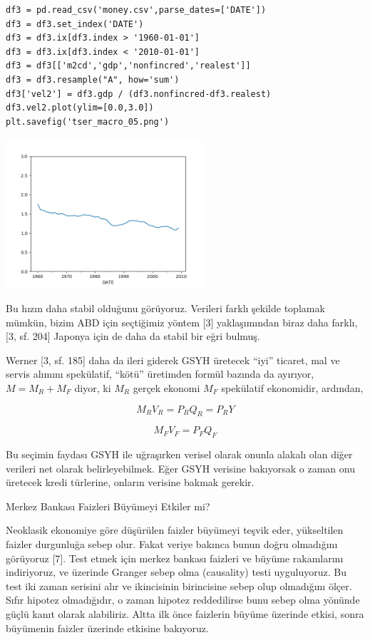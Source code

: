 \documentclass[12pt,fleqn]{article}\usepackage{../../common}
\begin{document}
\begin{verbatim}
df3 = pd.read_csv('money.csv',parse_dates=['DATE'])
df3 = df3.set_index('DATE')
df3 = df3.ix[df3.index > '1960-01-01']
df3 = df3.ix[df3.index < '2010-01-01']
df3 = df3[['m2cd','gdp','nonfincred','realest']]
df3 = df3.resample("A", how='sum') 
df3['vel2'] = df3.gdp / (df3.nonfincred-df3.realest)
df3.vel2.plot(ylim=[0.0,3.0])
plt.savefig('tser_macro_05.png')
\end{verbatim}

\includegraphics[width=20em]{tser_macro_05.png}

Bu hızın daha stabil olduğunu görüyoruz. Verileri farklı şekilde toplamak
mümkün, bizim ABD için seçtiğimiz yöntem [3] yaklaşımından biraz daha
farklı, [3, sf. 204] Japonya için de daha da stabil bir eğri bulmuş. 

Werner [3, sf. 185] daha da ileri giderek GSYH üretecek ``iyi'' ticaret,
mal ve servis alımını spekülatif, ``kötü'' üretimden formül bazında da
ayırıyor, $M = M_R + M_F$ diyor, ki $M_R$ gerçek ekonomi $M_F$ spekülatif
ekonomidir, ardından,

$$ M_RV_R = P_RQ_R = P_RY$$

$$ M_FV_F = P_FQ_F$$

Bu seçimin faydası GSYH ile uğraşırken verisel olarak onunla alakalı olan
diğer verileri net olarak belirleyebilmek. Eğer GSYH verisine bakıyorsak o
zaman onu üretecek kredi türlerine, onların verisine bakmak gerekir.

Merkez Bankası Faizleri Büyümeyi Etkiler mi?

Neoklasik ekonomiye göre düşürülen faizler büyümeyi teşvik eder,
yükseltilen faizler durgunluğa sebep olur. Fakat veriye bakınca bunun doğru
olmadığını görüyoruz [7]. Test etmek için merkez bankası faizleri ve büyüme
rakamlarını indiriyoruz, ve üzerinde Granger sebep olma (causality) testi
uyguluyoruz. Bu test iki zaman serisini alır ve ikincisinin birincisine
sebep olup olmadığını ölçer. Sıfır hipotez olmadığıdır, o zaman hipotez
reddedilirse bunu sebep olma yönünde güçlü kanıt olarak alabiliriz. Altta
ilk önce faizlerin büyüme üzerinde etkisi, sonra büyümenin faizler üzerinde
etkisine bakıyoruz.
\end{document}
